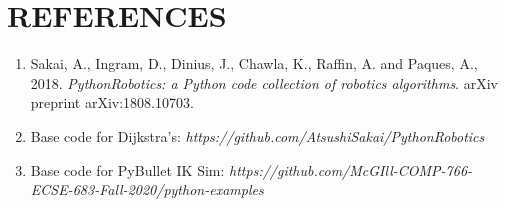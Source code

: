 \documentclass[a4paper]{article}
\begin{document}
\newpage

\section{REFERENCES}
\begin{enumerate}
    \item Sakai, A., Ingram, D., Dinius, J., Chawla, K., Raffin, A. and Paques, A., 2018. {\it PythonRobotics: a Python code collection of robotics algorithms}. arXiv preprint arXiv:1808.10703.
    \item Base code for Dijkstra's: {\it https://github.com/AtsushiSakai/PythonRobotics}
    \item Base code for PyBullet IK Sim: {\it https://github.com/McGIll-COMP-766-ECSE-683-Fall-2020/python-examples}
\end{enumerate}












\end{document}
